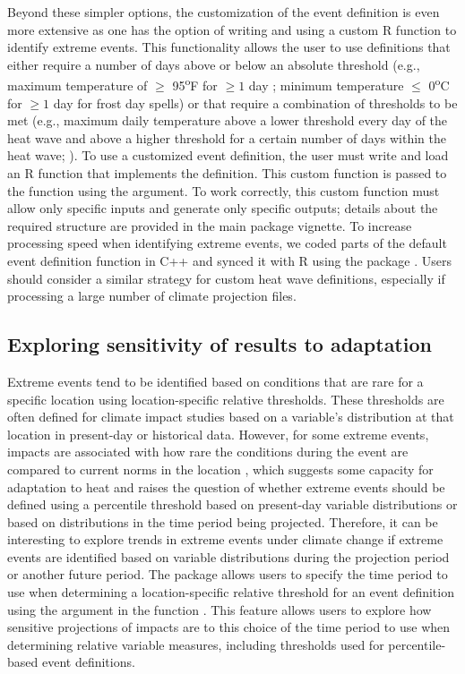 Beyond these simpler options, the customization of the event definition
is even more extensive as one has the option of writing and using a
custom R function to identify extreme events. This functionality allows
the user to use definitions that either require a number of days above
or below an absolute threshold (e.g., maximum temperature of \(\ge\)
95\textsuperscript{o}F for \(\ge1\) day
\citet{kent2014heat, tan2007heat}; minimum temperature \(\le\)
0\textsuperscript{o}C for \(\ge1\) day for frost day spells) or that
require a combination of thresholds to be met (e.g., maximum daily
temperature above a lower threshold every day of the heat wave and above
a higher threshold for a certain number of days within the heat wave;
\citet{kent2014heat, peng2011toward}). To use a customized event
definition, the user must write and load an R function that implements
the definition. This custom function is passed to the
 function using the 
argument. To work correctly, this custom function must allow only
specific inputs and generate only specific outputs; details about the
required structure are provided in the main 
package vignette. To increase processing speed when identifying extreme
events, we coded parts of the default event definition function in C++
and synced it with R using the  package \citep{Rcpp}.
Users should consider a similar strategy for custom heat wave
definitions, especially if processing a large number of climate
projection files.

\subsection{Exploring sensitivity of results to
adaptation}\label{exploring-sensitivity-of-results-to-adaptation}

Extreme events tend to be identified based on conditions that are rare
for a specific location using location-specific relative thresholds.
These thresholds are often defined for climate impact studies based on a
variable's distribution at that location in present-day or historical
data. However, for some extreme events, impacts are associated with how
rare the conditions during the event are compared to current norms in
the location \citep{anderson2009weather}, which suggests some capacity
for adaptation to heat and raises the question of whether extreme events
should be defined using a percentile threshold based on present-day
variable distributions or based on distributions in the time period
being projected. Therefore, it can be interesting to explore trends in
extreme events under climate change if extreme events are identified
based on variable distributions during the projection period or another
future period. The  package allows users to specify
the time period to use when determining a location-specific relative
threshold for an event definition using the 
argument in the function . This feature allows users
to explore how sensitive projections of impacts are to this choice of
the time period to use when determining relative variable measures,
including thresholds used for percentile-based event definitions.

